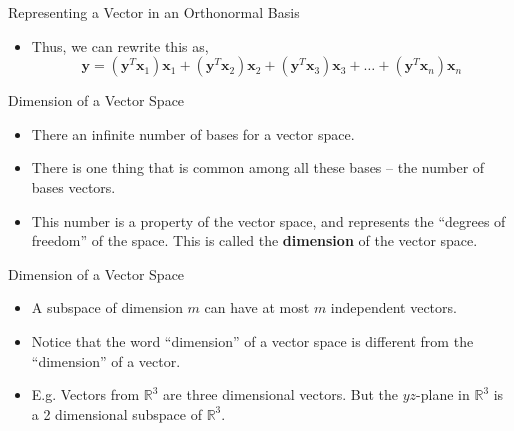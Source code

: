 \documentclass[aspectratio=169]{beamer}
\let\olditem\item
\renewcommand{\item}{\setlength{\itemsep}{\fill}\olditem}
\begin{document}
\begin{frame}[t]{Representing a Vector in an Orthonormal Basis}
\begin{itemize}
\item Thus, we can rewrite this as,
\[ \mathbf{y} = \left(\mathbf{y}^T\mathbf{x}_1\right)\mathbf{x}_1 + \left(\mathbf{y}^T\mathbf{x}_2\right)\mathbf{x}_2 + \left(\mathbf{y}^T\mathbf{x}_3\right)\mathbf{x}_3 + \ldots + \left(\mathbf{y}^T\mathbf{x}_n\right)\mathbf{x}_n \]
\end{itemize}
\begin{center}
\end{center}
\end{frame}


\begin{frame}[t]{Dimension of a Vector Space}
\begin{itemize}
\item There an infinite number of bases for a vector space.
\item There is one thing that is common among all these bases -- the number of bases vectors.
\item This number is a property of the vector space, and represents the ``degrees of freedom'' of the space. This is called the \textbf{dimension} of the vector space.
\end{itemize}
\end{frame}


\begin{frame}[t]{Dimension of a Vector Space}
\begin{itemize}
\item A subspace of dimension $m$ can have at most $m$ independent vectors.
\item Notice that the word ``dimension'' of a vector space is different from the ``dimension'' of a vector.
\item E.g. Vectors from $\mathbb{R}^3$ are three dimensional vectors. But the $yz$-plane in $\mathbb{R}^3$ is a 2 dimensional subspace of $\mathbb{R}^3$.
\end{itemize}
\end{frame}
\end{document}

